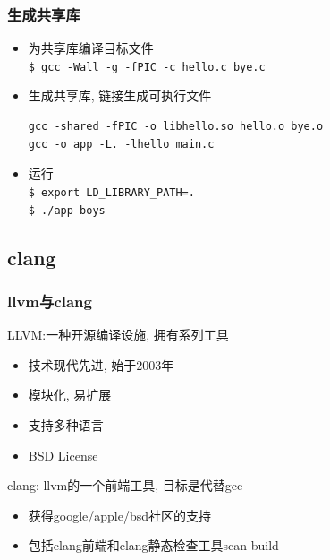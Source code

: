\documentclass[compress]{beamer}
\begin{document}
\begin{frame}[fragile]
\frametitle{生成共享库}

\begin{itemize}
\item 为共享库编译目标文件 \\
\verb~$ gcc -Wall -g -fPIC -c hello.c bye.c~
\item 生成共享库, 链接生成可执行文件
\begin{Verbatim}
gcc -shared -fPIC -o libhello.so hello.o bye.o
gcc -o app -L. -lhello main.c
\end{Verbatim}
\item 运行\\
\verb~$ export LD_LIBRARY_PATH=.~ \\
\verb~$ ./app boys~

\end{itemize}
\end{frame}

\subsection{clang}

\begin{frame}
    \frametitle{llvm与clang}

    \begin{block}{LLVM:一种开源编译设施, 拥有系列工具}
        \begin{itemize}
            \item 技术现代先进, 始于2003年
            \item 模块化, 易扩展
            \item 支持多种语言
            \item BSD License
        \end{itemize}
    \end{block}

    \begin{block}{clang: llvm的一个前端工具, 目标是代替gcc}
        \begin{itemize}
            \item 获得google/apple/bsd社区的支持
            \item 包括clang前端和clang静态检查工具scan-build
        \end{itemize}
    \end{block}
\end{frame}
\end{document}
